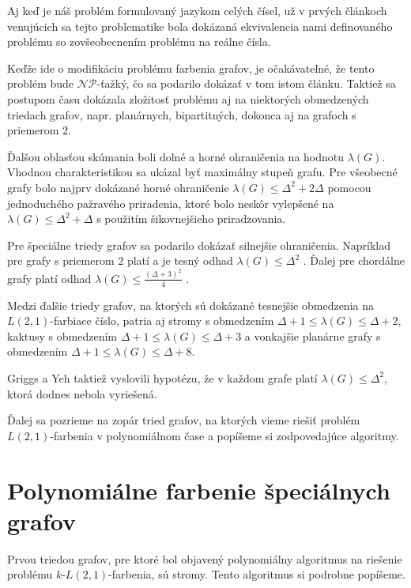 Aj keď je náš problém formulovaný jazykom celých čísel, už v prvých článkoch
venujúcich sa tejto problematike bola dokázaná ekvivalencia
nami definovaného problému so zovšeobecnením problému na reálne čísla\cite{griggs_yeh_tree}.

Keďže ide o modifikáciu problému farbenia grafov, je očakávateľné, že tento
problém bude $\mathcal{NP}$-ťažký, čo sa podarilo dokázať v tom istom článku.
Taktiež sa postupom času dokázala zložitosť problému aj na niektorých obmedzených
triedach grafov, napr. planárnych, bipartitných, dokonca aj na grafoch s
priemerom $2$\cite{color_survey}.

Ďalšou oblasťou skúmania boli dolné a horné ohraničenia na hodnotu $\lambda(G)$.
Vhodnou charakteristikou sa ukázal byť maximálny stupeň grafu. Pre všeobecné
grafy bolo najprv dokázané horné ohraničenie $\lambda(G) \leq \Delta^2 + 2\Delta$
pomocou jednoduchého pažravého priradenia\cite{griggs_yeh_tree},
ktoré bolo neskôr vylepšené na $\lambda(G) \leq \Delta^2 + \Delta$ s použitím
šikovnejšieho priradzovania\cite{chang_kuo}.

Pre špeciálne triedy grafov sa podarilo dokázať silnejšie ohraničenia. Napríklad
pre grafy s priemerom $2$ platí a je tesný odhad $\lambda(G) \leq \Delta^2$\cite{griggs_yeh_tree}
. Ďalej pre chordálne grafy platí odhad $\lambda(G) \leq \frac{\left( \Delta + 3 \right)^2}{4}$\cite{griggs_yeh_tree}
.

Medzi ďalšie triedy grafov, na ktorých sú dokázané tesnejšie obmedzenia na $L(2,1)$-farbiace
číslo, patria aj stromy s obmedzením $\Delta + 1 \leq \lambda(G) \leq \Delta + 2$\cite{griggs_yeh_tree},
kaktusy s obmedzením $\Delta + 1 \leq \lambda(G) \leq \Delta + 3$\cite{kaktusy} a vonkajšie planárne
grafy s obmedzením $\Delta + 1 \leq \lambda(G) \leq \Delta + 8$\cite{outer_planar_bound}.

Griggs a Yeh taktiež vyslovili hypotézu, že v každom grafe platí $\lambda(G) \leq \Delta^2$,
ktorá dodnes nebola vyriešená.

Ďalej sa pozrieme na zopár tried grafov, na ktorých vieme riešiť problém $L(2,1)$-farbenia
v polynomiálnom čase a popíšeme si zodpovedajúce algoritmy.

\section{Polynomiálne farbenie špeciálnych grafov}

Prvou triedou grafov, pre ktoré bol objavený polynomiálny algoritmus na riešenie
problému $k$-$L(2,1)$-farbenia, sú stromy\cite{chang_kuo}. Tento algoritmus si
podrobne popíšeme.

